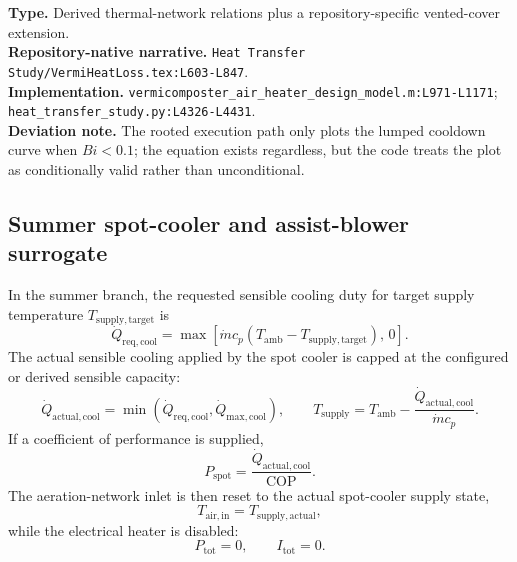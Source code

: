\documentclass[11pt]{article}
\newcommand{\srcref}[1]{\nolinkurl{#1}}
\newcommand{\filepath}[1]{\nolinkurl{#1}}
\begin{document}
\textbf{Type.} Derived thermal-network relations plus a repository-specific vented-cover extension. \\
\textbf{Repository-native narrative.} \filepath{Heat Transfer Study/VermiHeatLoss.tex:L603-L847}. \\
\textbf{Implementation.} \srcref{vermicomposter_air_heater_design_model.m:L971-L1171}; \srcref{heat_transfer_study.py:L4326-L4431}. \\
\textbf{Deviation note.} The rooted execution path only plots the lumped cooldown curve when \(Bi<0.1\); the equation exists regardless, but the code treats the plot as conditionally valid rather than unconditional.

\subsection{Summer spot-cooler and assist-blower surrogate}
In the summer branch, the requested sensible cooling duty for target supply temperature \(T_{\mathrm{supply,target}}\) is
\begin{equation}
\label{eq:spot_requested_load}
\dot Q_{\mathrm{req,cool}}=
\max\!\left[\dot m c_p\left(T_{\mathrm{amb}}-T_{\mathrm{supply,target}}\right),\,0\right].
\end{equation}
The actual sensible cooling applied by the spot cooler is capped at the configured or derived sensible capacity:
\begin{equation}
\label{eq:cooling_capacity}
\dot Q_{\mathrm{actual,cool}}=
\min\!\left(\dot Q_{\mathrm{req,cool}},\dot Q_{\mathrm{max,cool}}\right),
\qquad
T_{\mathrm{supply}}=
T_{\mathrm{amb}}-\frac{\dot Q_{\mathrm{actual,cool}}}{\dot m c_p}.
\end{equation}
If a coefficient of performance is supplied,
\begin{equation}
\label{eq:spot_cop_power}
P_{\mathrm{spot}}=\frac{\dot Q_{\mathrm{actual,cool}}}{\mathrm{COP}}.
\end{equation}
The aeration-network inlet is then reset to the actual spot-cooler supply state,
\begin{equation}
\label{eq:summer_air_inlet}
T_{\mathrm{air,in}}=T_{\mathrm{supply,actual}},
\end{equation}
while the electrical heater is disabled:
\begin{equation}
\label{eq:summer_zero_heater}
P_{\mathrm{tot}}=0,
\qquad
I_{\mathrm{tot}}=0.
\end{equation}
\end{document}
